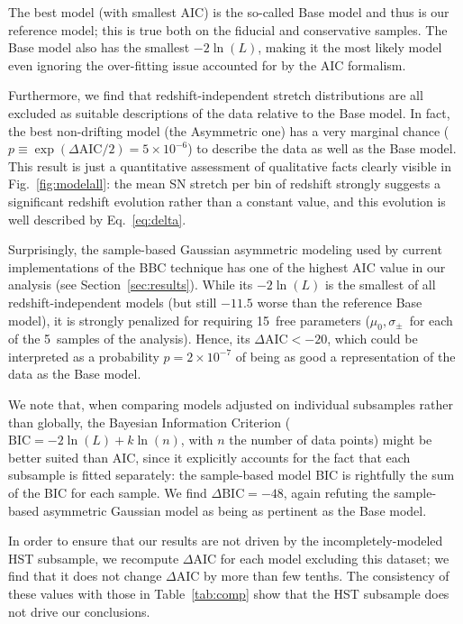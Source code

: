 \documentclass[]{aa}
\begin{document}
The best model (with smallest AIC) is the so-called Base model and thus is our
reference model; this is true both on the fiducial and conservative samples.
The Base model also has the smallest $-2\ln(L)$, making it the most likely
model even ignoring the over-fitting issue accounted for by the AIC formalism.

Furthermore, we find that redshift-independent stretch distributions are all
excluded as suitable descriptions of the data relative to the Base model. In
fact, the best non-drifting model (the Asymmetric one) has a very marginal
chance ($p \equiv \exp\left(\Delta\mathrm{AIC}/2\right) = 5\times10^{-6}$) to
describe the data as well as the Base model. This result is just a quantitative
assessment of qualitative facts clearly visible in Fig.~\ref{fig:modelall}: the
mean SN stretch per bin of redshift strongly suggests a significant redshift
evolution rather than a constant value, and this evolution is well described by
Eq.~\ref{eq:delta}.

Surprisingly, the sample-based Gaussian asymmetric modeling used by current
implementations of the BBC technique \citep{scolnic2016, kessler2017} has one of
the highest AIC value in our analysis (see Section~\ref{sec:results}). While its
$-2\ln(L)$ is the smallest of all redshift-independent models (but still $-11.5$
worse than the reference Base model), it is strongly penalized for requiring
15~free parameters ($\mu_0, \sigma_{\pm}$~for each of the 5~samples of the
analysis). Hence, its $\Delta\mathrm{AIC}<-20$, which could be interpreted as a
probability $p=2\times 10^{-7}$ of being as good a representation of the data
as the Base model.

We note that, when comparing models adjusted on individual subsamples rather
than globally, the Bayesian Information Criterion ($\mathrm{BIC} = -2\ln(L) +
k\ln(n)$, with $n$ the number of data points) might be better suited than AIC,
since it explicitly accounts for the fact that each subsample is fitted
separately: the sample-based model BIC is rightfully the sum of the BIC for each
sample. We find $\Delta\mathrm{BIC}=-48$, again refuting the sample-based
asymmetric Gaussian model as being as pertinent as the Base model.

In order to ensure that our results are not driven by the incompletely-modeled
HST subsample, we recompute $\Delta$AIC for each model excluding this dataset;
we find that it does not change $\Delta$AIC by more than few tenths. The
consistency of these values with those in Table~\ref{tab:comp} show that the HST
subsample does not drive our conclusions.
\end{document}
